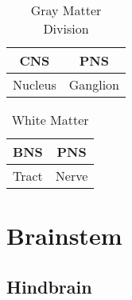 \begin{table}[htbp]
    \centering
    \begin{tabular}{cc}
        \toprule
        \textbf{CNS} & \textbf{PNS} \\ \midrule
        Nucleus      & Ganglion     \\
        \bottomrule
    \end{tabular}
    \caption{Gray Matter Division}\label{tab:}
\end{table}

\begin{table}[htbp]
    \centering
    \begin{tabular}{cc}
        \toprule
        \textbf{BNS} & \textbf{PNS} \\ \midrule
        Tract        & Nerve        \\
        \bottomrule
    \end{tabular}
    \caption{White Matter}\label{tab:}
\end{table}

\section{Brainstem}

\subsection{Hindbrain}

